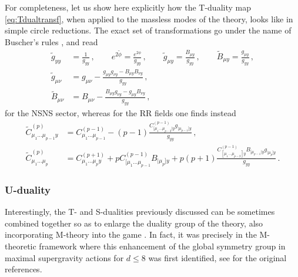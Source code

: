 For completeness, let us show here explicitly how the T-duality map \eqref{eq:Tdualtransf}, when applied to the massless modes of the theory, looks like in simple circle reductions. The exact set of transformations go under the name of Buscher's rules \cite{Buscher:1987sk,Buscher:1987qj}, and read
%
\begin{equation}\label{eq:BuscherrulesNS}
			\begin{aligned}
				\tilde{g}_{yy} &= \frac{1}{g_{yy}}\, , \qquad e^{2\tilde{\phi}} = \frac{e^{2\phi}}{g_{yy}}\, , \qquad \tilde{g}_{\mu y} = \frac{B_{\mu y}}{g_{yy}}\, , \qquad \tilde{B}_{\mu y} = \frac{g_{\mu y}}{g_{yy}}\, ,\\
              \tilde{g}_{\mu \nu} &= g_{\mu \nu} - \frac{g_{\mu y} g_{\nu y}-B_{\mu y} B_{\nu y}}{g_{yy}}\, ,\\
               \tilde{B}_{\mu \nu} &= B_{\mu \nu} - \frac{B_{\mu y} g_{\nu y}-g_{\mu y} B_{\nu y}}{g_{yy}}\, ,
			\end{aligned}
\end{equation}
%
for the NSNS sector, whereas for the RR fields one finds instead \cite{Meessen:1998qm}
%
\begin{equation}\label{eq:BuscherrulesRR}
			\begin{aligned}
				\tilde{C}^{(p)}_{\mu_1 \ldots \mu_{p-1} y} &= C^{(p-1)}_{\mu_1 \ldots \mu_{p-1}} - (p-1) \frac{C^{(p-1)}_{[\mu_1 \ldots \mu_{p-2} | y} g_{|\mu_{p-1}] y}}{g_{yy}}\, ,\\
               \tilde{C}^{(p)}_{\mu_1 \ldots \mu_{p}} &= C^{(p+1)}_{\mu_1 \ldots \mu_{p} y} + p C^{(p-1)}_{[\mu_1 \ldots \mu_{p-1}} B_{|\mu_{p}] y}+p(p+1)\frac{C^{(p-1)}_{[\mu_1 \ldots \mu_{p-2}] y} B_{[\mu_{p-1} | y} g_{|\mu_{p}] y}}{g_{yy}}\, .
			\end{aligned}
\end{equation}
%

\subsubsection*{U-duality}

Interestingly, the T- and S-dualities previously discussed can be sometimes combined together so as to enlarge the duality group of the theory, also incorporating M-theory into the game \cite{Hull:1994ys}. In fact, it was precisely in the M-theoretic framework where this enhancement of the global symmetry group in maximal supergravity actions for $d \leq 8$ was first identified, see \cite{Cremmer:1978ds, Cremmer:1979up,deWit:1985np,deWit:1986mz} for the original references. 

